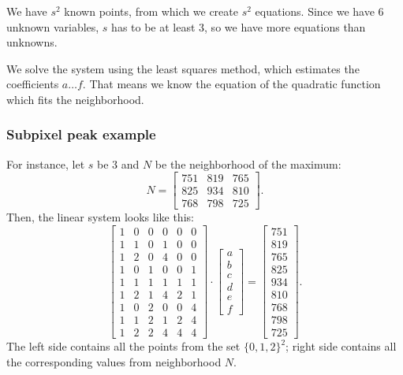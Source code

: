 We have $s^2$ known points, from which we create $s^2$ equations. Since we have 6 unknown variables, $s$ has to be at least 3, so we have more equations than unknowns. 

We solve the system using the least squares method, which estimates the coefficients $a \dots f$. That means we know the equation of the quadratic function which fits the neighborhood.

\subsubsection{Subpixel peak example}

For instance, let $s$ be 3 and $N$ be the neighborhood of the maximum:
\[
N =
\begin{bmatrix}
751 & 819 & 765 \\
825 & 934 & 810 \\
768 & 798 & 725
\end{bmatrix}.
\]
Then, the linear system looks like this:
\[
\begin{bmatrix}
1 & 0 & 0 & 0 & 0 & 0\\
1 & 1 & 0 & 1 & 0 & 0\\
1 & 2 & 0 & 4 & 0 & 0\\
1 & 0 & 1 & 0 & 0 & 1\\
1 & 1 & 1 & 1 & 1 & 1\\
1 & 2 & 1 & 4 & 2 & 1\\
1 & 0 & 2 & 0 & 0 & 4\\
1 & 1 & 2 & 1 & 2 & 4\\
1 & 2 & 2 & 4 & 4 & 4
\end{bmatrix}
\cdot
\begin{bmatrix}
a \\ b \\ c \\ d \\ e \\ f
\end{bmatrix}
=
\begin{bmatrix}
751 \\ 819 \\ 765 \\ 825 \\ 934 \\ 810 \\ 768 \\ 798 \\ 725
\end{bmatrix}.
\]
The left side contains all the points from the set $\{0,1,2\}^2$; right side contains all the corresponding values from neighborhood $N$.

